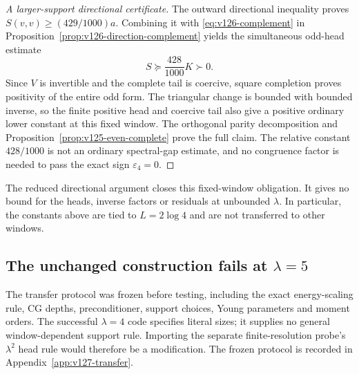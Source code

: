 \documentclass[11pt]{article}
\theoremstyle{remark}
\begin{document}
\begin{proof}[A larger-support directional certificate]
The outward directional inequality proves
$S(v,v)\ge(429/1000)a$. Combining it with
\eqref{eq:v126-complement} in
Proposition~\ref{prop:v126-direction-complement} yields the
simultaneous odd-head estimate
\begin{equation}\label{eq:v126-odd-relative-margin}
 S\succeq\frac{428}{1000}K\succ0.
\end{equation}
Since $V$ is invertible and the complete tail is coercive,
square completion proves positivity of the entire odd form.
The triangular change is bounded with bounded inverse, so the
finite positive head and coercive tail also give a positive
ordinary lower constant at this fixed window. The orthogonal
parity decomposition and Proposition~\ref{prop:v125-even-complete}
prove the full claim. The relative constant $428/1000$ is not
an ordinary spectral-gap estimate, and no congruence factor is
needed to pass the exact sign $\varepsilon_4=0$.
\end{proof}

The reduced directional argument closes this fixed-window obligation.
It gives no bound for the heads, inverse factors or residuals at
unbounded $\lambda$. In particular, the constants above are tied
to $L=2\log4$ and are not transferred to other windows.


\subsection*{The unchanged construction fails at $\lambda=5$}
\label{sec:v127-transfer}
The transfer protocol was frozen before testing, including the exact
energy-scaling rule, CG depths, preconditioner, support choices, Young
parameters and moment orders. The successful $\lambda=4$ code specifies
literal sizes; it supplies no general window-dependent support rule.
Importing the separate finite-resolution probe's $\lambda^2$ head rule
would therefore be a modification. The frozen protocol is recorded in
Appendix~\ref{app:v127-transfer}.
\end{document}
